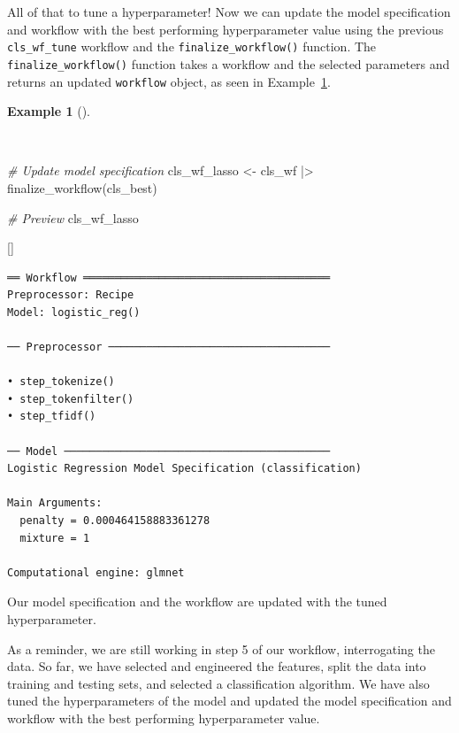 \documentclass[
  letterpaper,
  krantz1]{latex/krantz-mod}
\newenvironment{Shaded}{\begin{snugshade}}{\end{snugshade}}
\newcommand{\CommentTok}[1]{\textcolor[rgb]{0.00,0.00,0.00}{\textit{#1}}}
\newcommand{\FunctionTok}[1]{\textcolor[rgb]{0.00,0.00,0.00}{#1}}
\newcommand{\NormalTok}[1]{\textcolor[rgb]{0.00,0.00,0.00}{#1}}
\newcommand{\OtherTok}[1]{\textcolor[rgb]{0.00,0.00,0.00}{#1}}
\newcommand{\SpecialCharTok}[1]{\textcolor[rgb]{0.00,0.00,0.00}{#1}}
\newcommand{\cindex}[1]{%
  \StrSubstitute{#1}{_}{\_}[\temp]%
  \index{\temp}%
}
\theoremstyle{definition}
\theoremstyle{definition}
\newtheorem{example}{Example}[chapter]
\theoremstyle{remark}
\begin{document}
All of that to tune a hyperparameter! Now we can update the model
specification and workflow with the best performing hyperparameter value
using the previous \texttt{cls\_wf\_tune} workflow and the
\texttt{finalize\_workflow()} function. The
\texttt{finalize\_workflow()} function takes a workflow and the selected
parameters and returns an updated \texttt{workflow} object, as seen in
Example~\ref{exm-predict-class-tune-hyperparameters-update-workflow}.

\begin{example}[]\protect\hypertarget{exm-predict-class-tune-hyperparameters-update-workflow}{}\label{exm-predict-class-tune-hyperparameters-update-workflow}

~

\begin{Shaded}
\begin{Highlighting}[numbers=left,,]
\CommentTok{\# Update model specification}
\NormalTok{cls\_wf\_lasso }\OtherTok{\textless{}{-}}
\NormalTok{  cls\_wf }\SpecialCharTok{|\textgreater{}}
  \FunctionTok{finalize\_workflow}\NormalTok{(cls\_best)}

\CommentTok{\# Preview}
\NormalTok{cls\_wf\_lasso}
\end{Highlighting}
\end{Shaded}

 \cindex{finalize_workflow()}

\begin{verbatim}
══ Workflow ═══════════════════════════════════════
Preprocessor: Recipe
Model: logistic_reg()

── Preprocessor ───────────────────────────────────

• step_tokenize()
• step_tokenfilter()
• step_tfidf()

── Model ──────────────────────────────────────────
Logistic Regression Model Specification (classification)

Main Arguments:
  penalty = 0.000464158883361278
  mixture = 1

Computational engine: glmnet
\end{verbatim}

\end{example}

Our model specification and the workflow are updated with the tuned
hyperparameter.

As a reminder, we are still working in step 5 of our workflow,
interrogating the data. So far, we have selected and engineered the
features, split the data into training and testing sets, and selected a
classification algorithm. We have also tuned the hyperparameters of the
model and updated the model specification and workflow with the best
performing hyperparameter value.
\end{document}
